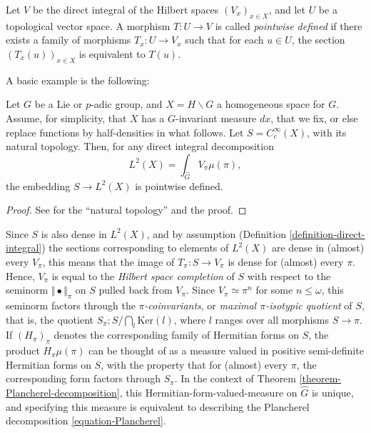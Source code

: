 \begin{definition} 
\label{definition-pointwise-defined}
Let $V$ be the direct integral of the Hilbert spaces $(V_x)_{x\in X}$, and let $U$ be a topological vector space. A morphism $T:U\to V$ is called {\it pointwise defined} if there exists a family of morphisms $T_x:U\to V_x$ such that for each $u\in U$, the section $(T_x(u))_{x\in X}$ is equivalent to $T(u)$.
\end{definition}

A basic example is the following:

\begin{proposition}
 \label{proposition-pointwise-defined-Ccinfty}
Let $G$ be a Lie or $p$-adic group, and $X= H\backslash G$ a homogeneous space for $G$. Assume, for simplicity, that $X$ has a $G$-invariant measure $dx$, that we fix, or else replace functions by half-densities in what follows. Let $S=C_c^\infty(X)$, with its natural topology. Then, for any direct integral decomposition 
$$ L^2(X) = \int_{\hat G} V_\pi \mu(\pi),$$
the embedding $S\to L^2(X)$ is pointwise defined.
\end{proposition}

\begin{proof}
 See \cite[2.3]{Bernstein-Plancherel} for the ``natural topology'' and the proof.
\end{proof}

Since $S$ is also dense in $L^2(X)$, and by assumption (Definition \ref{definition-direct-integral}) the sections corresponding to elements of $L^2(X)$ are dense in (almost) every $V_\pi$, this means that the image of $T_\pi: S\to V_\pi$ is dense for (almost) every $\pi$. Hence, $V_\pi$ is equal to the \emph{Hilbert space completion} of $S$ with respect to the seminorm $\Vert\bullet\Vert_\pi$ on $S$ pulled back from $V_\pi$. Since $V_\pi\simeq \pi^n$ for some $n\le \omega$, this seminorm factors through the {\it $\pi$-coinvariants}, or \emph{maximal $\pi$-isotypic quotient} of $S$, that is, the quotient $S_\pi: S/\bigcap_{l} \text{Ker}(l)$, where $l$ ranges over all morphisms $S\to \pi$. If $(H_\pi)_\pi$ denotes the corresponding family of Hermitian forms on $S$, the product $H_\pi \mu(\pi)$ can be thought of as a measure valued in positive semi-definite Hermitian forms on $S$, with the property that for (almost) every $\pi$, the corresponding form factors through $S_\pi$. In the context of Theorem \ref{theorem-Plancherel-decomposition}, this Hermitian-form-valued-measure on $\hat G$ is unique, and specifying this measure is equivalent to describing the Plancherel decomposition \eqref{equation-Plancherel}.


















